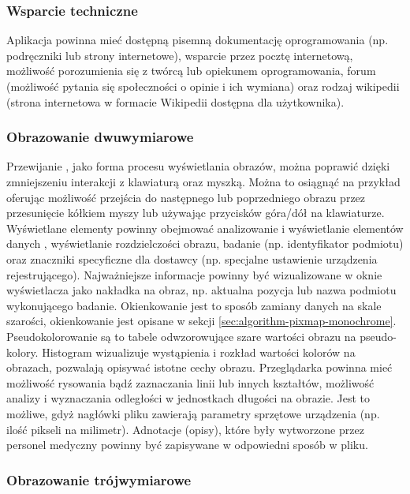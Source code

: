 \subsubsection{Wsparcie techniczne}

Aplikacja powinna mieć dostępną pisemną dokumentację oprogramowania (np. podręczniki lub strony internetowe), wsparcie przez pocztę internetową, możliwość porozumienia się z twórcą lub opiekunem oprogramowania, forum (możliwość pytania się społeczności o opinie i ich wymiana) oraz rodzaj wikipedii (strona internetowa w formacie Wikipedii dostępna dla użytkownika).

\subsubsection{Obrazowanie dwuwymiarowe}

Przewijanie , jako forma procesu wyświetlania obrazów, można poprawić dzięki zmniejszeniu interakcji z klawiaturą oraz myszką.
Można to osiągnąć na przykład oferując możliwość przejścia do następnego lub poprzedniego obrazu przez przesunięcie kółkiem myszy lub używając przycisków góra/dół na klawiaturze.
Wyświetlane elementy powinny obejmować analizowanie i wyświetlanie elementów danych \DICOM, wyświetlanie rozdzielczości obrazu, badanie (np. identyfikator podmiotu) oraz znaczniki \DICOM specyficzne dla dostawcy (np. specjalne ustawienie urządzenia rejestrującego).
Najważniejsze informacje powinny być wizualizowane w oknie wyświetlacza jako nakładka na obraz, np. aktualna pozycja lub nazwa podmiotu wykonującego badanie.
Okienkowanie jest to sposób zamiany danych na skale szarości, okienkowanie jest opisane w sekcji \ref{sec:algorithm-pixmap-monochrome}.
Pseudokolorowanie są to tabele odwzorowujące szare wartości obrazu na pseudo-kolory.
Histogram wizualizuje wystąpienia i rozkład wartości kolorów na obrazach, pozwalają opisywać istotne cechy obrazu.
Przeglądarka powinna mieć możliwość rysowania bądź zaznaczania linii lub innych kształtów, możliwość analizy i wyznaczania odległości w jednostkach długości na obrazie.
Jest to możliwe, gdyż nagłówki pliku \DICOM zawierają parametry sprzętowe urządzenia (np. ilość pikseli na milimetr).
Adnotacje (opisy), które były wytworzone przez personel medyczny powinny być zapisywane w odpowiedni sposób w pliku.

\subsubsection{Obrazowanie trójwymiarowe}

